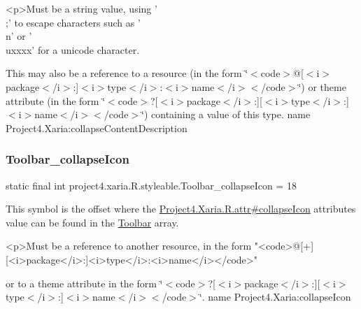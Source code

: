 \begin{DoxyVerb}      <p>Must be a string value, using '\\;' to escape characters such as '\\n' or '\\uxxxx' for a unicode character.
\end{DoxyVerb}
 

This may also be a reference to a resource (in the form \char`\"{}$<$code$>$@\mbox{[}$<$i$>$package$<$/i$>$\+:\mbox{]}$<$i$>$type$<$/i$>$\+:$<$i$>$name$<$/i$>$$<$/code$>$\char`\"{}) or theme attribute (in the form \char`\"{}$<$code$>$?\mbox{[}$<$i$>$package$<$/i$>$\+:\mbox{]}\mbox{[}$<$i$>$type$<$/i$>$\+:\mbox{]}$<$i$>$name$<$/i$>$$<$/code$>$\char`\"{}) containing a value of this type.  name Project4.\+Xaria\+:collapse\+Content\+Description \mbox{\label{classproject4_1_1xaria_1_1R_1_1styleable_a2cf454b5f11a8dc6f39c763c9a877b20}} 
\subsubsection{\texorpdfstring{Toolbar\+\_\+collapse\+Icon}{Toolbar\_collapseIcon}}
{\footnotesize\ttfamily static final int project4.\+xaria.\+R.\+styleable.\+Toolbar\+\_\+collapse\+Icon = 18\hspace{0.3cm}{\ttfamily [static]}}

This symbol is the offset where the \hyperlink{}{Project4.\+Xaria.\+R.\+attr\#collapse\+Icon} attribute\textquotesingle{}s value can be found in the \hyperlink{classproject4_1_1xaria_1_1R_1_1styleable_af6c30f9e9e086f6bf4e510669443fa59}{Toolbar} array.

\begin{DoxyVerb}      <p>Must be a reference to another resource, in the form "<code>@[+][<i>package</i>:]<i>type</i>:<i>name</i></code>"
\end{DoxyVerb}
 or to a theme attribute in the form \char`\"{}$<$code$>$?\mbox{[}$<$i$>$package$<$/i$>$\+:\mbox{]}\mbox{[}$<$i$>$type$<$/i$>$\+:\mbox{]}$<$i$>$name$<$/i$>$$<$/code$>$\char`\"{}.  name Project4.\+Xaria\+:collapse\+Icon \mbox{\label{classproject4_1_1xaria_1_1R_1_1styleable_a57f6aadbc973e24685a86eedaafd5f4c}} 
